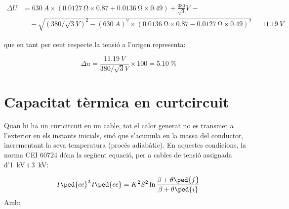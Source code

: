 \begin{exemple}
    \[ \begin{split}
       \Delta U &=  \SI{630}{A} \times( \SI{0,0127}{\ohm} \times \num{0,87} + \SI{0,0136}{\ohm} \times \num{0,49}) + \frac{380}{\sqrt{3}}\unit{V} \,- \\
        & \quad - \sqrt{\left(380/\sqrt{3}\unit{V}\right)^2 - \left(\SI{630}{A}\right)^2 \times  \left( \SI{0,0136}{\ohm} \times \num{0,87} - \SI{0,0127}{\ohm} \times \num{0,49} \right)^2 } \,= \SI{11,19}{V}
    \end{split} \]

    que en tant per cent respecte la tensi\'{o} a l'origen representa:

    \[
        \Delta u = \frac{\SI{11,19}{V}}{380/\sqrt{3}\unit{V}} \times 100 = \SI{5,10}{\%}
    \]
\end{exemple}

\section{Capacitat t\`{e}rmica en curtcircuit}\label{ces:cables_Icc_termica}

Quan hi ha un curtcircuit en un cable, tot el calor generat no es transmet a l'exterior en els instants inicials, sin\'{o} que s'acumula en la massa del conductor, incrementant la seva temperatura (proc\'{e}s adiab\`{a}tic). En aquestes condicions, la norma \textsf{CEI 60724} d\'{o}na la seg\"{u}ent equaci\'{o}, per a cables de tensi\'{o} assignada d'\SI{1}{kV} i \SI{3}{kV}:

\begin{equation}
   I\ped{cc}^2 \,t\ped{cc} = K^2 S^2 \ln \frac{\beta + \theta\ped{f}}{\beta + \theta\ped{i}}
\end{equation}
Amb:

